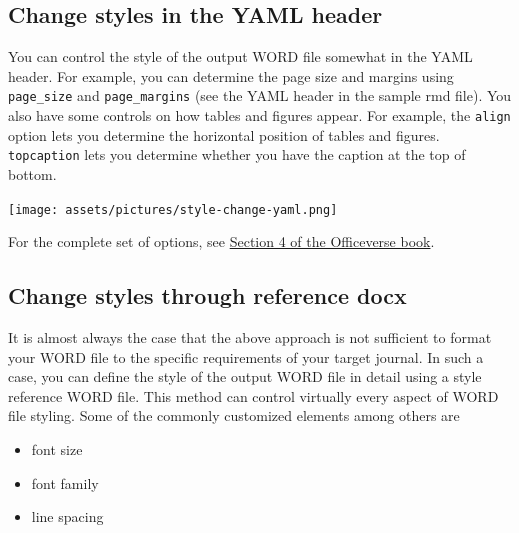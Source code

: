 \documentclass[
  letterpaper,
  DIV=11,
  numbers=noendperiod]{scrreprt}
\providecommand{\tightlist}{%
  \setlength{\itemsep}{0pt}\setlength{\parskip}{0pt}}\usepackage{longtable,booktabs,array}
\begin{document}
\hypertarget{sec-change-style-yaml}{%
\subsection{Change styles in the YAML
header}\label{sec-change-style-yaml}}

You can control the style of the output WORD file somewhat in the YAML
header. For example, you can determine the page size and margins using
\texttt{page\_size} and \texttt{page\_margins} (see the YAML header in
the sample rmd file). You also have some controls on how tables and
figures appear. For example, the \texttt{align} option lets you
determine the horizontal position of tables and figures.
\texttt{topcaption} lets you determine whether you have the caption at
the top of bottom.

\texttt{[image: assets/pictures/style-change-yaml.png]}

\begin{tcolorbox}[enhanced jigsaw, colframe=quarto-callout-tip-color-frame, toptitle=1mm, colbacktitle=quarto-callout-tip-color!10!white, toprule=.15mm, colback=white, arc=.35mm, bottomtitle=1mm, opacitybacktitle=0.6, breakable, left=2mm, coltitle=black, leftrule=.75mm, title=\textcolor{quarto-callout-tip-color}{\faLightbulb}\hspace{0.5em}{Tip}, rightrule=.15mm, titlerule=0mm, opacityback=0, bottomrule=.15mm]

For the complete set of options, see
\href{https://ardata-fr.github.io/officeverse/officedown-for-word.html}{Section
4 of the Officeverse book}.

\end{tcolorbox}

\hypertarget{sec-change-style-reference}{%
\subsection{Change styles through reference
docx}\label{sec-change-style-reference}}

It is almost always the case that the above approach is not sufficient
to format your WORD file to the specific requirements of your target
journal. In such a case, you can define the style of the output WORD
file in detail using a style reference WORD file. This method can
control virtually every aspect of WORD file styling. Some of the
commonly customized elements among others are

\begin{itemize}
\tightlist
\item
  font size
\item
  font family
\item
  line spacing
\end{itemize}
\end{document}
